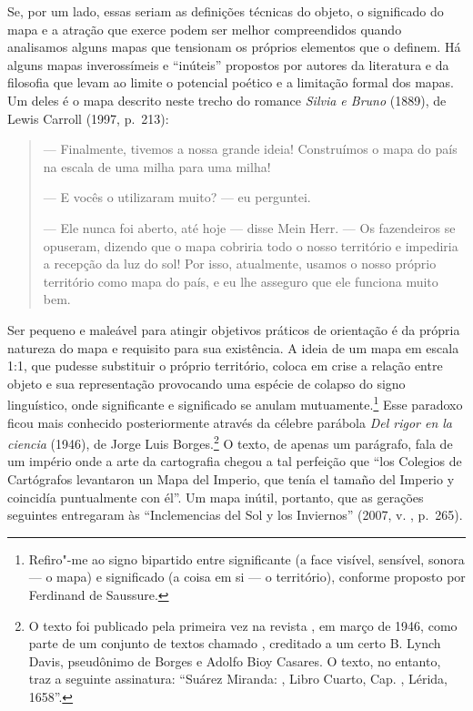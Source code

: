 Se, por um lado, essas seriam as definições técnicas do objeto, o
significado do mapa e a atração que exerce podem ser melhor
compreendidos quando analisamos alguns mapas que tensionam os próprios
elementos que o definem. Há alguns mapas inverossímeis e ``inúteis''
propostos por autores da literatura e da filosofia que levam ao limite o
potencial poético e a limitação formal dos mapas. Um deles é o mapa
descrito neste trecho do romance \emph{Silvia e Bruno} (1889), de Lewis Carroll (1997, p.~213):

\begin{quote}
--- Finalmente, tivemos a nossa grande ideia! Construímos o mapa do país
na escala de uma milha para uma milha!

--- E vocês o utilizaram muito? --- eu perguntei.

--- Ele nunca foi aberto, até hoje --- disse Mein Herr. --- Os fazendeiros
se opuseram, dizendo que o mapa cobriria todo o nosso território e
impediria a recepção da luz do sol! Por isso, atualmente, usamos o nosso
próprio território como mapa do país, e eu lhe asseguro que ele funciona
muito bem.
\end{quote}

Ser pequeno e maleável para atingir objetivos práticos de orientação é \label{escala}
da própria natureza do mapa e requisito para sua existência. A ideia de
um mapa em escala 1:1, que pudesse substituir o próprio território,
coloca em crise a relação entre objeto e sua representação provocando
uma espécie de colapso do signo linguístico, onde significante e
significado se anulam mutuamente.\footnote{Refiro"-me ao signo bipartido
  entre significante (a face visível, sensível, sonora --- o mapa) e
  significado (a coisa em si --- o território), conforme proposto por
  Ferdinand de Saussure.} Esse paradoxo ficou mais conhecido
posteriormente através da célebre parábola \emph{Del rigor en la
ciencia} (1946), de Jorge Luis Borges.\footnote{O texto foi publicado
  pela primeira vez na revista {}, em
  março de 1946, como parte de um conjunto de textos chamado
  {}, creditado a um certo B. Lynch Davis, pseudônimo de
  Borges e Adolfo Bioy Casares. O texto, no entanto, traz a seguinte
  assinatura: ``Suárez Miranda: {},
  Libro Cuarto, Cap. , Lérida, 1658''.} O texto, de apenas um parágrafo, fala de um império onde a arte da cartografia
chegou a tal perfeição que ``los Colegios de Cartógrafos levantaron un
Mapa del Imperio, que tenía el tamaño del Imperio y coincidía
puntualmente con él''. Um mapa inútil, portanto, que as gerações
seguintes entregaram às ``Inclemencias del Sol y los Inviernos'' (2007,
v. , p.~265).


